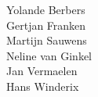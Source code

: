 \flushright{}
Yolande Berbers\\
Gertjan Franken\\
Martijn Sauwens\\
Neline van Ginkel\\
Jan Vermaelen\\
Hans Winderix\\
